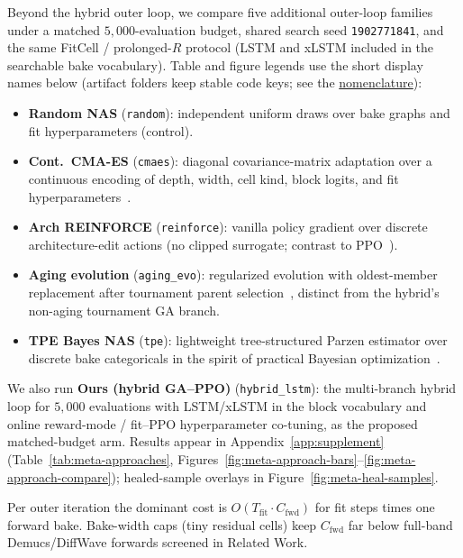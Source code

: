 Beyond the hybrid outer loop, we compare five additional outer-loop families under a matched $5{,}000$-evaluation budget, shared search seed \texttt{1902771841}, and the same FitCell / prolonged-$R$ protocol (LSTM and xLSTM included in the searchable bake vocabulary).
Table and figure legends use the short display names below (artifact folders keep stable code keys; see the \href{https://github.com/reeldemo/denoise-opt-meta/blob/master/paper/Unsupervised_Wavetable_Seam_Artifact_Repair_via_Hybrid_GA-PPO_Meta-Search_v10/NOMENCLATURE.md}{nomenclature}):
\begin{itemize}
  \item \textbf{Random NAS} (\texttt{random}): independent uniform draws over bake graphs and fit hyperparameters (control).
  \item \textbf{Cont.\ CMA-ES} (\texttt{cmaes}): diagonal covariance-matrix adaptation over a continuous encoding of depth, width, cell kind, block logits, and fit hyperparameters~\cite{hansen2016cmaes}.
  \item \textbf{Arch REINFORCE} (\texttt{reinforce}): vanilla policy gradient over discrete architecture-edit actions (no clipped surrogate; contrast to PPO~\cite{schulman2017,zoph2017nas}).
  \item \textbf{Aging evolution} (\texttt{aging\_evo}): regularized evolution with oldest-member replacement after tournament parent selection~\cite{real2017large,real2019}, distinct from the hybrid's non-aging tournament GA branch.
  \item \textbf{TPE Bayes NAS} (\texttt{tpe}): lightweight tree-structured Parzen estimator over discrete bake categoricals in the spirit of practical Bayesian optimization~\cite{snoek2012}.
\end{itemize}
We also run \textbf{Ours (hybrid GA--PPO)} (\texttt{hybrid\_lstm}): the multi-branch hybrid loop for $5{,}000$ evaluations with LSTM/xLSTM in the block vocabulary and online reward-mode / fit--PPO hyperparameter co-tuning, as the proposed matched-budget arm.
Results appear in Appendix~\ref{app:supplement} (Table~\ref{tab:meta-approaches}, Figures~\ref{fig:meta-approach-bars}--\ref{fig:meta-approach-compare}); healed-sample overlays in Figure~\ref{fig:meta-heal-samples}.

\begin{remark}
\label{rem:complexity}
Per outer iteration the dominant cost is $O(T_{\mathrm{fit}}\cdot C_{\mathrm{fwd}})$ for fit steps times one forward bake.
Bake-width caps (tiny residual cells) keep $C_{\mathrm{fwd}}$ far below full-band Demucs/DiffWave forwards screened in Related Work.
\end{remark}

